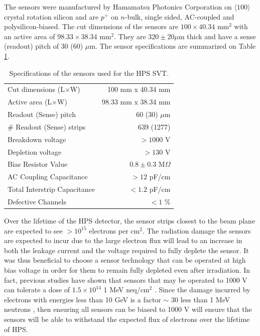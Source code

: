 The sensors were manufactured by Hamamatsu Photonics Corporation on 
$\langle 100 \rangle$ crystal rotation silicon and are $p^{+}$ on $n$-bulk, 
single sided, AC-coupled and polysilicon-biased. The cut dimensions of the 
sensors are $100 \times 40.34$ mm$^{2}$ with an active area of 
$98.33 \times 38.34$ mm$^{2}$. They are $320 \pm 20 \mu$m thick and have a sense
(readout) pitch of 30 (60) $\mu$m. The sensor specifications are summarized on 
Table \ref{tab:sensor_specs}.
\begin{table}[t]
    \centering
    \begin{tabular}{lr}
        \toprule
        Cut dimensions (L$\times$W)     & 100 mm x 40.34 mm \\
        Active area (L$\times$W)        & 98.33 mm x 38.34 mm \\
        Readout (Sense) pitch           & 60 (30) $\mu$m \\
        \# Readout (Sense) strips       & 639 (1277) \\
        Breakdown voltage               & $>1000$ V \\
        Depletion voltage               & $> 130$ V \\
        Bias Resistor Value             & $0.8 \pm 0.3$ M$\Omega$ \\
        AC Coupling Capacitance         & $>12$ pF/cm \\
        Total Interstrip Capacitance    & $< 1.2$ pF/cm \\
        Defective Channels              & $<1$ \% \\
        \bottomrule
    \end{tabular}
    \caption{Specifications of the sensors used for the HPS SVT.}
    \label{tab:sensor_specs}
\end{table}

Over the lifetime of the HPS detector, the sensor strips closest to the beam 
plane are expected to see $>10^{15}$ electrons per cm$^2$.  The radiation
damage the sensors are expected to incur due to the large electron flux
will lead to an increase in both the leakage current and the voltage required to 
fully deplete the sensor.  It was thus beneficial to choose a sensor technology
that can be operated at high bias voltage in order for them to remain fully
depleted even after irradiation. In fact, previous studies have shown that 
sensors that may be operated to 1000 V can tolerate a dose of 
$1.5 \times 10^{14}$ 1 MeV neq/cm$^2$ \cite{Fretwurst:2002vb}.  Since the damage
incurred by electrons with energies less than 10 GeV is a factor $\sim$ 30 less
than 1 MeV neutrons \cite{Rashevskaya:2002nd},
then ensuring all sensors can be biased to 1000 V will ensure that the sensors
will be able to withstand the expected flux of electrons over the lifetime of
HPS. 


